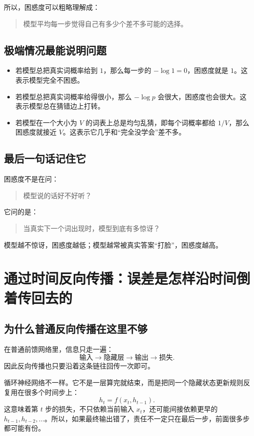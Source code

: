\documentclass[12pt,a4paper]{ctexart}
\begin{document}
所以，困惑度可以粗略理解成：
\begin{quote}
模型平均每一步觉得自己有多少个差不多可能的选择。
\end{quote}

\subsection{极端情况最能说明问题}

\begin{itemize}
  \item 若模型总把真实词概率给到 \(1\)，那么每一步的 \(-\log 1 = 0\)，困惑度就是 \(1\)。这表示模型完全不困惑。
  \item 若模型总把真实词概率给得很小，那么 \(-\log p\) 会很大，困惑度也会很大。这表示模型总在猜错边上打转。
  \item 若模型在一个大小为 \(V\) 的词表上总是均匀乱猜，即每个词概率都给 \(1/V\)，那么困惑度就接近 \(V\)。这表示它几乎和“完全没学会”差不多。
\end{itemize}

\subsection{最后一句话记住它}

困惑度不是在问：
\begin{quote}
模型说的话好不好听？
\end{quote}
它问的是：
\begin{quote}
当真实下一个词出现时，模型到底有多惊讶？
\end{quote}

模型越不惊讶，困惑度越低；模型越常被真实答案“打脸”，困惑度越高。

\section{通过时间反向传播：误差是怎样沿时间倒着传回去的}

\subsection{为什么普通反向传播在这里不够}

在普通前馈网络里，信息只走一遍：
\[
\text{输入} \longrightarrow \text{隐藏层} \longrightarrow \text{输出} \longrightarrow \text{损失}.
\]
因此反向传播也只要沿着这条链往回传一次即可。

循环神经网络不一样。它不是一层算完就结束，而是把同一个隐藏状态更新规则反复用在很多个时间步上：
\[
h_t = f(x_t, h_{t-1}).
\]
这意味着第 \(t\) 步的损失，不只依赖当前输入 \(x_t\)，还可能间接依赖更早的 \(h_{t-1}, h_{t-2}, \ldots\)。所以，如果最终输出错了，责任不一定只在最后一步，前面很多步都可能有份。
\end{document}
